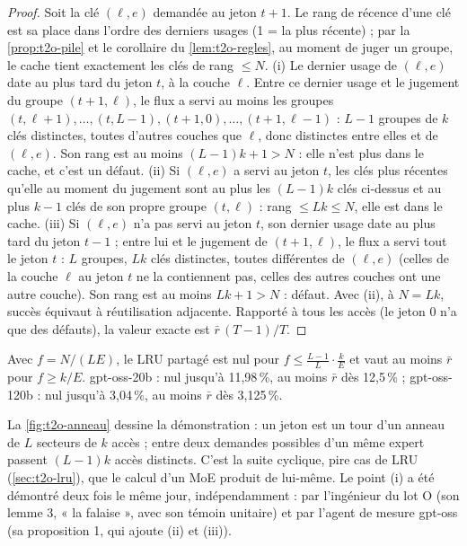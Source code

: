 \begin{proof}
Soit la clé $(\ell, e)$ demandée au jeton $t+1$. Le rang de récence d'une clé est sa place dans l'ordre des derniers usages (1 = la plus récente) ; par la \cref{prop:t2o-pile} et le corollaire du \cref{lem:t2o-regles}, au moment de juger un groupe, le cache tient exactement les clés de rang $\le N$.
(i) Le dernier usage de $(\ell, e)$ date au plus tard du jeton $t$, à la couche $\ell$. Entre ce dernier usage et le jugement du groupe $(t+1, \ell)$, le flux a servi au moins les groupes $(t, \ell+1), \ldots, (t, L-1), (t+1, 0), \ldots, (t+1, \ell-1)$ : $L - 1$ groupes de $k$ clés distinctes, toutes d'autres couches que $\ell$, donc distinctes entre elles et de $(\ell, e)$. Son rang est au moins $(L-1)k + 1 > N$ : elle n'est plus dans le cache, et c'est un défaut.
(ii) Si $(\ell, e)$ a servi au jeton $t$, les clés plus récentes qu'elle au moment du jugement sont au plus les $(L-1)k$ clés ci-dessus et au plus $k - 1$ clés de son propre groupe $(t, \ell)$ : rang $\le Lk \le N$, elle est dans le cache.
(iii) Si $(\ell, e)$ n'a pas servi au jeton $t$, son dernier usage date au plus tard du jeton $t - 1$ ; entre lui et le jugement de $(t+1, \ell)$, le flux a servi tout le jeton $t$ : $L$ groupes, $Lk$ clés distinctes, toutes différentes de $(\ell, e)$ (celles de la couche $\ell$ au jeton $t$ ne la contiennent pas, celles des autres couches ont une autre couche). Son rang est au moins $Lk + 1 > N$ : défaut. Avec (ii), à $N = Lk$, succès équivaut à réutilisation adjacente. Rapporté à tous les accès (le jeton 0 n'a que des défauts), la valeur exacte est $\bar r\,(T-1)/T$.
\end{proof}

\begin{corollaire}\label{cor:t2o-fraction}
Avec $f = N/(LE)$, le LRU partagé est nul pour $f \le \frac{L-1}{L}\cdot\frac{k}{E}$ et vaut au moins $\bar r$ pour $f \ge k/E$. gpt-oss-20b : nul jusqu'à 11,98\,\%, au moins $\bar r$ dès 12,5\,\% ; gpt-oss-120b : nul jusqu'à 3,04\,\%, au moins $\bar r$ dès 3,125\,\%.
\end{corollaire}

La \cref{fig:t2o-anneau} dessine la démonstration : un jeton est un tour d'un anneau de $L$ secteurs de $k$ accès ; entre deux demandes possibles d'un même expert passent $(L-1)k$ accès distincts. C'est la suite cyclique, pire cas de LRU (\cref{sec:t2o-lru}), que le calcul d'un MoE produit de lui-même. Le point (i) a été démontré deux fois le même jour, indépendamment : par l'ingénieur du lot O (son lemme 3, « la falaise », avec son témoin unitaire) et par l'agent de mesure gpt-oss (sa proposition 1, qui ajoute (ii) et (iii)).

